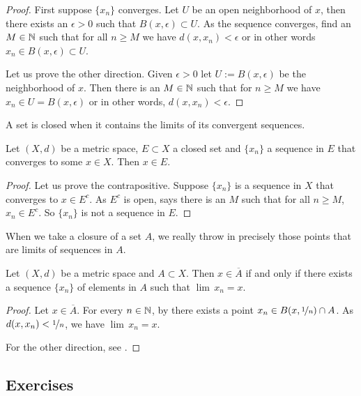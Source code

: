 \begin{proof}
First suppose $\{ x_n \}$ converges.  Let $U$ be an open neighborhood
of $x$, then there exists an $\epsilon > 0$ such that $B(x,\epsilon) \subset
U$.  As the sequence converges, find an $M \in {\mathbb{N}}$ such that for all $n \geq
M$ we have $d(x,x_n) < \epsilon$ or in other words $x_n \in B(x,\epsilon)
\subset U$.

Let us prove the other direction.  Given $\epsilon > 0$ let $U :=
B(x,\epsilon)$ be the neighborhood of $x$.  Then there is an $M \in {\mathbb{N}}$
such that for $n \geq M$ we have $x_n \in U = B(x,\epsilon)$ or in other
words, $d(x,x_n) < \epsilon$.
\end{proof}

A set is closed when it contains the limits of its convergent sequences.

\begin{prop} \label{prop:msclosedlim}
Let $(X,d)$ be a metric space, $E \subset X$ a closed set
and $\{ x_n \}$ a sequence in $E$ that converges to some $x \in X$.
Then $x \in E$.
\end{prop}

\begin{proof}
Let us prove the contrapositive.
Suppose $\{ x_n \}$ is a sequence in $X$ that converges to $x \in E^c$.
As $E^c$ is open,  says there is
an $M$ such that for all $n \geq M$,
$x_n \in E^c$.  So $\{ x_n \}$  is not a sequence in $E$.
\end{proof}

When we take a closure of a set $A$, we really throw in precisely 
those points that are limits of sequences in $A$.

\begin{prop} \label{prop:msclosureapprseq}
Let $(X,d)$ be a metric space and $A \subset X$.
Then $x \in \overline{A}$ if and only if there exists a sequence $\{ x_n \}$ of
elements in $A$ such that $\lim\, x_n = x$.
\end{prop}

\begin{proof}
Let $x \in \overline{A}$.  For every $n \in {\mathbb{N}}$,
by
 there
exists a point $x_n \in B(x,\nicefrac{1}{n}) \cap A$.
As $d(x,x_n) < \nicefrac{1}{n}$, we have $\lim\, x_n = x$.

For the other direction, see .
\end{proof}

\subsection{Exercises}

